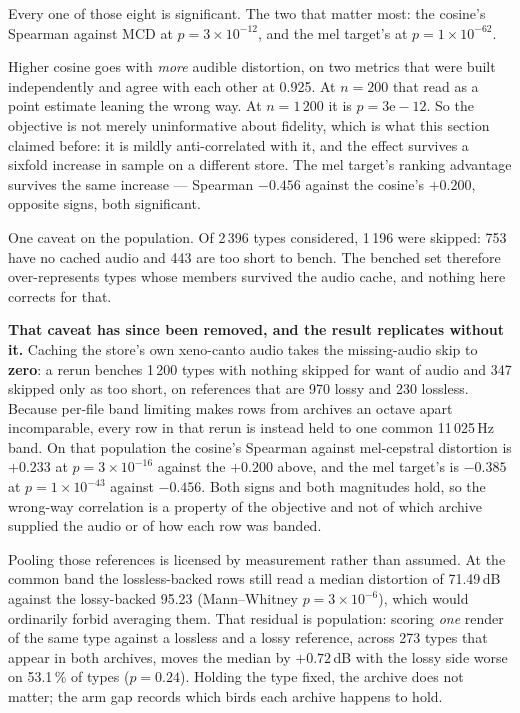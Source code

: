 \documentclass[10pt,twocolumn,a4paper]{article}
\begin{document}
Every one of those eight is significant. The two that matter most: the cosine's Spearman against
MCD at $p = 3\times10^{-12}$, and the mel target's at $p = 1\times10^{-62}$.

Higher cosine goes with \emph{more} audible distortion, on two metrics that were built
independently and agree with each other at 0.925. At $n = 200$ that read as a point estimate
leaning the wrong way. At $n = 1\,200$ it is $p = 3\mathrm{e}{-}12$. So the objective is not
merely uninformative about fidelity, which is what this section claimed before: it is mildly
anti-correlated with it, and the effect survives a sixfold increase in sample on a different
store. The mel target's ranking advantage survives the same increase --- Spearman $-0.456$
against the cosine's $+0.200$, opposite signs, both significant.

One caveat on the population. Of 2\,396 types considered, 1\,196 were skipped: 753 have no
cached audio and 443 are too short to bench. The benched set therefore over-represents types
whose members survived the audio cache, and nothing here corrects for that.

\textbf{That caveat has since been removed, and the result replicates without it.} Caching the
store's own xeno-canto audio takes the missing-audio skip to \textbf{zero}: a rerun benches
1\,200 types with nothing skipped for want of audio and 347 skipped only as too short, on
references that are 970 lossy and 230 lossless. Because per-file band limiting makes rows from
archives an octave apart incomparable, every row in that rerun is instead held to one common
11\,025\,Hz band. On that population the cosine's Spearman against mel-cepstral distortion is
$+0.233$ at $p = 3\times10^{-16}$ against the $+0.200$ above, and the mel target's is $-0.385$
at $p = 1\times10^{-43}$ against $-0.456$. Both signs and both magnitudes hold, so the
wrong-way correlation is a property of the objective and not of which archive supplied the
audio or of how each row was banded.

Pooling those references is licensed by measurement rather than assumed. At the common band the
lossless-backed rows still read a median distortion of 71.49\,dB against the lossy-backed
95.23 (Mann--Whitney $p = 3\times10^{-6}$), which would ordinarily forbid averaging them. That
residual is population: scoring \emph{one} render of the same type against a lossless and a
lossy reference, across 273 types that appear in both archives, moves the median by
$+0.72$\,dB with the lossy side worse on 53.1\,\% of types ($p = 0.24$). Holding the type
fixed, the archive does not matter; the arm gap records which birds each archive happens to
hold.
\end{document}
